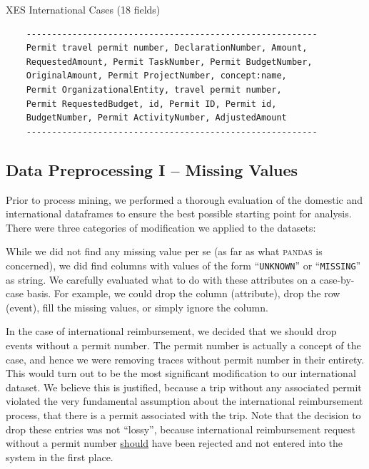 \documentclass[conference]{IEEEtran}
\begin{document}
\begin{table}[htbp]
\caption{XES International Cases (18 fields)}
\begin{center}
\begin{verbatim}
    ---------------------------------------------------------
    Permit travel permit number, DeclarationNumber, Amount,
    RequestedAmount, Permit TaskNumber, Permit BudgetNumber,
    OriginalAmount, Permit ProjectNumber, concept:name,
    Permit OrganizationalEntity, travel permit number,
    Permit RequestedBudget, id, Permit ID, Permit id,
    BudgetNumber, Permit ActivityNumber, AdjustedAmount        
    ---------------------------------------------------------
\end{verbatim}
\end{center}
\label{table-international}
\end{table}

\subsection{Data Preprocessing I -- Missing Values}


Prior to process mining, we performed a thorough evaluation of the
domestic and international dataframes to ensure the best possible starting
point for analysis. There were three categories of modification we applied
to the datasets:

While we did not find any missing value per se (as far
as what \textsc{pandas} is concerned), we did find columns with values of
the form ``\texttt{UNKNOWN}'' or ``\texttt{MISSING}'' as string. We
carefully evaluated what to do with these attributes on a case-by-case
basis. For example, we could drop the column (attribute), drop the row
(event), fill the missing values, or simply ignore the column.

In the case of international reimbursement, we decided that we should
drop events without a permit number. The permit number is actually a
concept of the case, and hence we were removing traces without permit
number in their entirety. This would turn out to be the most significant
modification to our international dataset.
We believe this is justified, because a trip
without any associated permit violated the very fundamental assumption
about the international reimbursement process, that there is a permit
associated with the trip. Note that the decision to drop these entries was
not ``lossy'', because international reimbursement request without a permit
number \underline{should} have been rejected and not entered into the system
in the first place.
\end{document}
